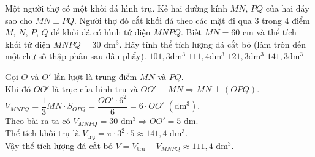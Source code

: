 \begin{ex}%
	Một người thợ có một khối đá hình trụ. Kẻ hai đường kính $MN$, $PQ$ của hai đáy sao cho $MN\perp PQ$. Người thợ đó cắt khối đá theo các mặt đi qua $3$ trong $4$ điểm $M$, $N$, $P$, $Q$ để khối đá có hình tứ diện $MNPQ$. Biết $MN=60$ cm và thể tích khối tứ diện $MNPQ=30$ $\text{d}{\text{m}^3}$. Hãy tính thể tích lượng đá cắt bỏ (làm tròn đến một chữ số thập phân sau dấu phẩy).
	\choice
	{$101,3\text{d}{\text{m}^3}$}
	{\True $111,4\text{d}{\text{m}^3}$}
	{$121,3\text{d}{\text{m}^3}$}
	{$141,3\text{d}{\text{m}^3}$}
	\loigiai
	{\begin{center}
		\end{center}
		Gọi $O$ và $O'$ lần lượt là trung điểm $MN$ và $PQ$.\\
		Khi đó $OO'$ là trục của hình trụ và $O{O}'\perp MN\Rightarrow MN\perp\left(OPQ\right)$.\\
		$V_{MNPQ}=\dfrac{1}{3}MN\cdot S_{OPQ}=\dfrac{O{O}'\cdot {6^2}}{6}=6\cdot O{O}'$ $\left(\text{d}{\text{m}^{\text{3}}}\right)$.\\
		Theo bài ra ta có $V_{MNPQ}=30$ $\text{d}{\text{m}^3}\Rightarrow O{O}'=5$ $\text{dm}$.\\
		Thể tích khối trụ là $V_\text{trụ}=\pi\cdot {3^2}\cdot 5\approx 141,4$ $\text{d}{\text{m}^3}$.\\
		Vậy thể tích lượng đá cắt bỏ $V=V_\text{trụ}-V_{MNPQ}\approx 111,4$ $\text{d}{\text{m}^3}$.}
\end{ex}

